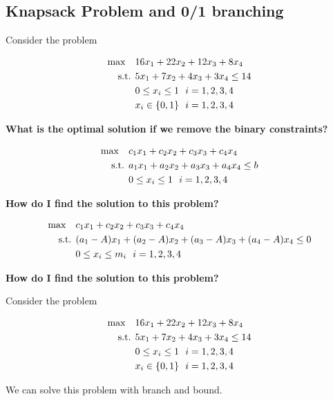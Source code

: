 \documentclass[../open-optimization/open-optimization.tex]{subfiles}
\begin{document}
\subsection{Knapsack Problem  and 0/1 branching}

Consider the problem 

\begin{align*}
\max \quad & 16x_1 + 22x_2 + 12x_3 + 8 x_4\\
\text{ s.t. } & 5x_1 + 7x_2 + 4x_3 + 3x_4 \leq 14\\
& 0 \leq x_i \leq 1 \ \ i=1,2,3,4\\
& x_i \in \{0,1\} \ \ i=1,2,3,4
\end{align*}

\textbf{What is the optimal solution if we remove the binary constraints?}

\newpage



\begin{align*}
\max \quad & c_1 x_1 + c_2 x_2 + c_3 x_3 + c_4 x_4\\
\text{ s.t. } & a_1 x_1 + a_2 x_2 + a_3 x_3 + a_4 x_4 \leq b\\
& 0 \leq x_i \leq 1 \ \ i=1,2,3,4\\
\end{align*}

\textbf{How do I find the solution to this problem?}

\newpage

\begin{align*}
\max \quad & c_1 x_1 + c_2 x_2 + c_3 x_3 + c_4 x_4\\
\text{ s.t. } & (a_1 - A)x_1 + (a_2-A) x_2 + (a_3-A) x_3 + (a_4-A) x_4 \leq 0\\
& 0 \leq x_i \leq m_i \ \ i=1,2,3,4\\
\end{align*}

\textbf{How do I find the solution to this problem?}

\newpage


Consider the problem 

\begin{align*}
\max \quad & 16x_1 + 22x_2 + 12x_3 + 8 x_4\\
\text{ s.t. } & 5x_1 + 7x_2 + 4x_3 + 3x_4 \leq 14\\
& 0 \leq x_i \leq 1 \ \ i=1,2,3,4\\
& x_i \in \{0,1\} \ \ i=1,2,3,4
\end{align*}

We can solve this problem with branch and bound.
\end{document}
